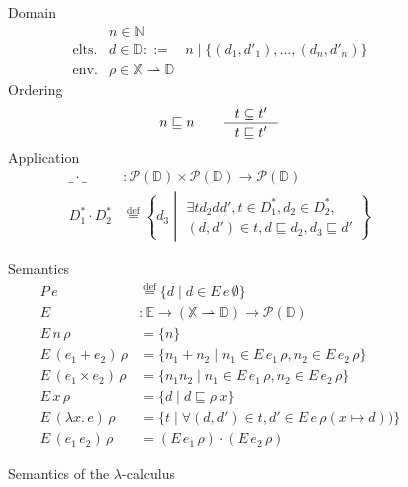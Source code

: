 \documentclass{tufte-handout}
\newcommand{\defeq}[0]{\overset{\mathrm{def}}{=}}
\newcommand{\LAM}[1]{\lambda #1.\,}
\newcommand{\pto}[0]{\rightharpoonup}
\newcommand{\VAR}[0]{\mathbb{X}}
\newcommand{\ext}[3]{#3(#1{\mapsto}#2)}
\begin{document}
\begin{figure*}
\begin{minipage}{0.5\textwidth}
Domain
\[
\begin{array}{lrl}
               & n \in \mathbb{N} \\
  \text{elts.} & d \in \mathbb{D} ::= &n \mid \{ (d_1,d'_1), \ldots, (d_n,d'_n) \} \\
  \text{env.} & \rho \in  \VAR \pto \mathbb{D} 
\end{array}
\]
Ordering
\[
   n \sqsubseteq n \qquad 
   \inference{t \subseteq t'}{t \sqsubseteq t'}
\]
Application
\begin{align*}
  \_ \cdot \_ &: \mathcal{P}(\mathbb{D}) \times \mathcal{P}(\mathbb{D})\to \mathcal{P}(\mathbb{D}) \\
  D^{*}_1 \cdot D^{*}_2 & \defeq
    \left\{ d_3 \middle|
    \begin{array}{l}
      \exists t d_2 d d', t \in D^{*}_1,  d_2 \in D^{*}_2, \\
      (d,d') \in t, d \sqsubseteq d_2, d_3 \sqsubseteq d'
    \end{array}
    \right\}
\end{align*}
\end{minipage}
\begin{minipage}{0.5\textwidth}
Semantics
\begin{align*}
  P\,e &\defeq \{ d \mid d \in E\,e\,\emptyset\} \\[1ex]
  E & : \mathbb{E} \to (\VAR \pto \mathbb{D}) \to \mathcal{P}(\mathbb{D})\\
  E\, n \, \rho & = \{ n \} \\
  E\, (e_1 + e_2) \, \rho & = \{ n_1 + n_2 \mid n_1 \in E\,e_1\,\rho, 
                                    n_2 \in E\,e_2\,\rho \} \\
  E\, (e_1 \times e_2) \, \rho & = \{ n_1 n_2 \mid n_1 \in E\,e_1\,\rho, 
                                    n_2 \in E\,e_2\,\rho \} \\
  E\, x \,\rho &= \{ d \mid d \sqsubseteq \rho\,x \} \\
  E\, (\LAM{x}e)\,\rho &= 
      \{ t \mid \forall (d,d') \in t, d' \in E\,e\,\ext{x}{ d}{\rho}) \} \\
  E\, (e_1\,e_2)\,\rho &= (E\,e_1\,\rho) \cdot (E\,e_2\,\rho)
\end{align*}
\end{minipage}
\caption{Semantics of the $\lambda$-calculus}
\label{fig:lambda}
\end{figure*}
\end{document}
